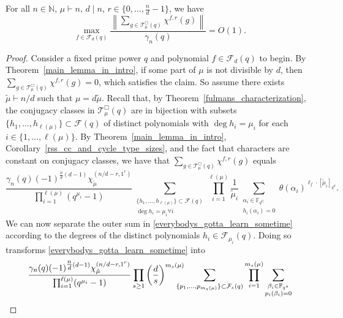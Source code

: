 \documentclass[Unicode,ALCO]{cedram}
\newcommand{\F}{\mathbb{F}}
\newcommand{\CF}{\mathcal{F}}
\newcommand{\N}{\mathbb{N}}
\newcommand{\CT}{\mathcal{T}}
\newcommand{\te}{\theta}
\begin{document}
\begin{lemma}
\label{char_sum_norm_lemma}
For all \(n \in \N, \, \mu \vdash n, \, d \mid n\), \(r \in \{0,\ldots,\tfrac{n}{d}-1\}\), we have
\begin{equation}
\max_{f \in \CF_d(q)}
\frac{\left \| \sum_{g \in \CT^\Box_\mu(q)} \chi^{f,r}(g) \right \|}{\gamma_n(q)}
=
O(1).
\end{equation}
\end{lemma}

\begin{proof}
Consider a fixed prime power \(q\) and polynomial \(f \in \CF_d (q)\) to begin.
By Theorem~\ref{main_lemma_in_intro}, if some part of \(\mu\) is not divisible by \(d\), then \(\sum_{g \in \CT_\mu^\Box (q)} \chi^{f,r}(g) = 0\), which satisfies the claim.
So assume there exists \(\tilde{\mu} \vdash n/d\) such that \(\mu = d \tilde{\mu}\).
Recall that, by Theorem~\ref{fulmans_characterization}, the conjugacy classes in \(\CT_\mu^\Box (q)\) are in bijection with subsets \(\{h_1,\ldots,h_{\ell(\mu)}\} \subset \CF (q)\) of distinct polynomials with \(\deg h_i = \mu_i\) for each \(i \in \{1,\ldots,\ell(\mu)\}\).
By Theorem~\ref{main_lemma_in_intro}, Corollary~\ref{rss_cc_and_cycle_type_sizes}, and the fact that characters are constant on conjugacy classes, we have that
\(
\sum_{g \in \CT_\mu^\Box (q)}
\chi^{f,r} (g)\)
equals
\begin{equation}
\label{everybodys_gotta_learn_sometime}
\frac{\gamma_n(q) (-1)^{\tfrac{n}{d}(d-1)} \chi^{(n/d-r,1^r)}_{\tilde{\mu}}}{\prod_{i=1}^{\ell(\mu)} (q^{\mu_i}-1)}
\sum_{ \substack{\{ h_1,\ldots,h_{\ell(\mu)}\} \subset \CF (q) \\ \deg h_i = \mu_i \forall i} }
\prod_{i=1}^{\ell(\mu)}
\frac{1}{\tilde{\mu}_i}
\sum_{\substack{\alpha_i \in \F_{q^{\mu_i}} \\ h_i(\alpha_i) = 0}}
\te(\alpha_i)^{\ell_f \cdot [\tilde{\mu}_i]_{q^d}}.
\end{equation}
We can now separate the outer sum in \eqref{everybodys_gotta_learn_sometime} according to the degrees of the distinct polynomials \(h_i \in \CF_{\mu_i} (q)\).
Doing so transforms \eqref{everybodys_gotta_learn_sometime} into
\begin{equation}
\frac{\gamma_n(q) (-1)^{\tfrac{n}{d}(d-1)} \chi^{(n/d-r,1^r)}_{\tilde{\mu}}}{\prod_{i=1}^{\ell(\mu)} (q^{\mu_i}-1)}
\prod_{s \geq 1}
\left (
\frac{d}{s}
\right )^{m_s(\mu)}
\hspace{-0.4cm} \sum_{ \{p_1,\ldots,p_{m_s(\mu)}\} \subset \CF_s (q) }
\prod_{i=1}^{m_s(\mu)}
\sum_{\substack{\beta_i \in \F_{q^s} \\ p_i(\beta_i)=0}}

\end{equation}
\end{proof}
\end{document}
